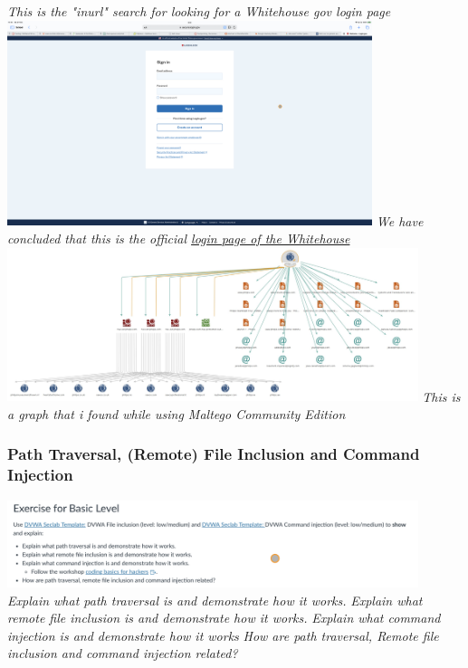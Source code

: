 \documentclass[12pt, letterpaper]{article}
\begin{document}
\break
\emph{This is the "inurl" search for looking for a Whitehouse gov login page}
\hfill\break
\hfill\break
\includegraphics[width=0.8\textwidth]{fotos/Week 3/Whitehouse login page.jpeg}
\break
\emph{We have concluded that this is the official \hyperlink{secure.login.gov}{login page of the Whitehouse}}
\hfill\break
\hfill\break
\includegraphics[width=0.9\textwidth]{fotos/Week 3/Maltego - philips.jpg}
\break
\emph{This is a graph that i found while using Maltego Community Edition}
\newpage
\subsubsection{Path Traversal, (Remote) File Inclusion and Command Injection}
\includegraphics[width=0.9\textwidth]{fotos/Week 3/Path Traversal, (Remote) File Inclusion and Command Injection/Basic level dvwa command injection.jpeg}
\hfill\break
\emph{Explain what path traversal is and demonstrate how it works.}
\hfill\break
\hfill\break
\emph{Explain what remote file inclusion is and demonstrate how it works.}
\hfill\break
\hfill\break
\emph{Explain what command injection is and demonstrate how it works}
\hfill\break
\hfill\break
\emph{How are path traversal, Remote file inclusion and command injection related?}
\newpage
\end{document}
